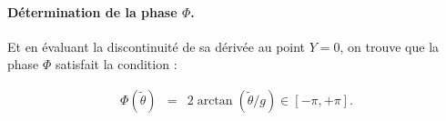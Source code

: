 
\paragraph{Détermination de la phase $\Phi$.}
Et en évaluant la discontinuité de sa dérivée au point $Y = 0$, on trouve que la phase $\Phi$ satisfait la condition :


\begin{eqnarray}\label{chap:1:dif.mod.2.part.2}
	\Phi(\tilde{\theta}) & = & 2 \arctan (\tilde{\theta}/g) \in [ - \pi , +\pi ].
\end{eqnarray}


